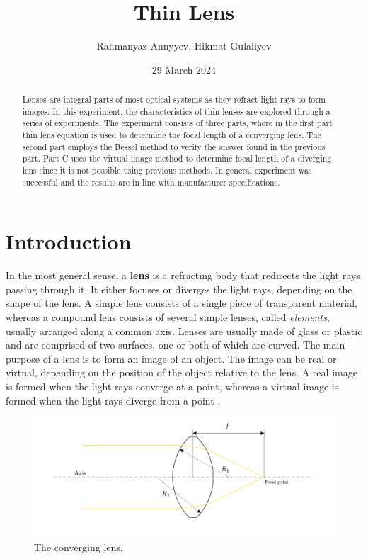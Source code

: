 \documentclass[10pt]{article}
\title{Thin Lens}
\author{Rahmanyaz Annyyev, Hikmat Gulaliyev}
\date{29 March 2024}
\begin{document}
\maketitle

\begin{abstract}
Lenses are integral parts of most optical systems as they refract light rays to form images. In this experiment, the characteristics of thin lenses are explored through a series of experiments. The experiment consists of three parts, where in the first part thin lens equation is used to determine the focal length of a converging lens.
The second part employs the Bessel method to verify the answer found in the previous part. Part C uses the virtual image method to determine focal length of a diverging lens since it is not possible using previous methods. In general experiment was successful and the results are in line with manufacturer specifications. 
\end{abstract}

\section{Introduction}


In the most general sense, a \textbf{lens} is a refracting body that redirects the light rays passing through it. It either focuses or diverges the light rays, depending on the shape of the lens. A simple lens consists of a single piece of transparent material, whereas a compound lens consists of several simple lenses, called \textit{elements}, usually arranged along a common axis. Lenses are usually made of glass or plastic and are comprised of two surfaces, one or both of which are curved. The main purpose of a lens is to form an image of an object. The image can be real or virtual, depending on the position of the object relative to the lens. A real image is formed when the light rays converge at a point, whereas a virtual image is formed when the light rays diverge from a point \cite{Giancoli_2014}. 

\begin{figure}[hbt!]
  \centering
  \includegraphics[scale=0.5]{figures/f1.pdf}
  \caption{The converging lens.}
  \label{fig:1}
\end{figure}
\end{document}
